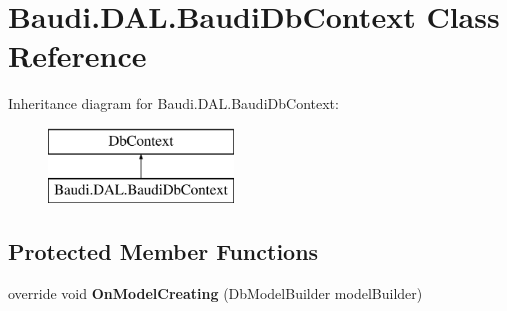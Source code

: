 \hypertarget{class_baudi_1_1_d_a_l_1_1_baudi_db_context}{}\section{Baudi.\+D\+A\+L.\+Baudi\+Db\+Context Class Reference}
\label{class_baudi_1_1_d_a_l_1_1_baudi_db_context}
Inheritance diagram for Baudi.\+D\+A\+L.\+Baudi\+Db\+Context\+:\begin{figure}[H]
\begin{center}
\leavevmode
\includegraphics[height=2.000000cm]{class_baudi_1_1_d_a_l_1_1_baudi_db_context}
\end{center}
\end{figure}
\subsection*{Protected Member Functions}
\begin{DoxyCompactItemize}
\item 
\hypertarget{class_baudi_1_1_d_a_l_1_1_baudi_db_context_ab757f161615e124ff79718885b1c8371}{}override void {\bfseries On\+Model\+Creating} (Db\+Model\+Builder model\+Builder)\label{class_baudi_1_1_d_a_l_1_1_baudi_db_context_ab757f161615e124ff79718885b1c8371}

\end{DoxyCompactItemize}
